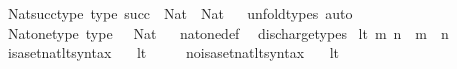 \begin{isabellebody}
\endisatagproof
{\isafoldproof}%
%
\isadelimproof
%
\endisadelimproof
\isanewline
\isanewline
{}\isamarkupfalse%
\ Nat{\isacharunderscore}{\kern0pt}succ{\isacharunderscore}{\kern0pt}type\ {\isacharbrackleft}{\kern0pt}type{\isacharbrackright}{\kern0pt}{\isacharcolon}{\kern0pt}\ {\isachardoublequoteopen}succ\ {\isacharcolon}{\kern0pt}\ Nat\ {\isasymRightarrow}\ Nat{\isachardoublequoteclose}%
\isadelimproof
\ %
\endisadelimproof
%
\isatagproof
{}\isamarkupfalse%
\ unfold{\isacharunderscore}{\kern0pt}types\ auto%
\endisatagproof
{\isafoldproof}%
%
\isadelimproof
%
\endisadelimproof
\isanewline
\isanewline
{}\isamarkupfalse%
\ Nat{\isacharunderscore}{\kern0pt}one{\isacharunderscore}{\kern0pt}type\ {\isacharbrackleft}{\kern0pt}type{\isacharbrackright}{\kern0pt}{\isacharcolon}{\kern0pt}\ {\isachardoublequoteopen}{}\ {\isacharcolon}{\kern0pt}\ Nat{\isachardoublequoteclose}%
\isadelimproof
\ %
\endisadelimproof
%
\isatagproof
{}\isamarkupfalse%
\ nat{\isacharunderscore}{\kern0pt}one{\isacharunderscore}{\kern0pt}def\ \isamarkupfalse%
\ discharge{\isacharunderscore}{\kern0pt}types%
\endisatagproof
{\isafoldproof}%
%
\isadelimproof
%
\endisadelimproof
%
\isadelimdocument
%
\endisadelimdocument
%
\isatagdocument
%
\isamarkuptrue%
%
\endisatagdocument
{\isafolddocument}%
%
\isadelimdocument
%
\endisadelimdocument
{}\isamarkupfalse%
\ {\isachardoublequoteopen}lt\ m\ n\ {\isasymequiv}\ m\ {\isasymin}\ n{\isachardoublequoteclose}\isanewline
\isanewline
{}\isamarkupfalse%
\ isa{\isacharunderscore}{\kern0pt}set{\isacharunderscore}{\kern0pt}nat{\isacharunderscore}{\kern0pt}lt{\isacharunderscore}{\kern0pt}syntax\ \ \isamarkupfalse%
\ lt\ {\isacharparenleft}{\kern0pt}\ {\isachardoublequoteopen}{\isacharless}{\kern0pt}{\isachardoublequoteclose}\ {}{}{\isacharparenright}{\kern0pt}\ \isamarkupfalse%
\isanewline
{}\isamarkupfalse%
\ no{\isacharunderscore}{\kern0pt}isa{\isacharunderscore}{\kern0pt}set{\isacharunderscore}{\kern0pt}nat{\isacharunderscore}{\kern0pt}lt{\isacharunderscore}{\kern0pt}syntax\ \ \isamarkupfalse%
\ lt\ {\isacharparenleft}{\kern0pt}\ {\isachardoublequoteopen}{\isacharless}{\kern0pt}{\isachardoublequoteclose}\ {}{}{\isacharparenright}{\kern0pt}\ \isamarkupfalse%

\end{isabellebody}
